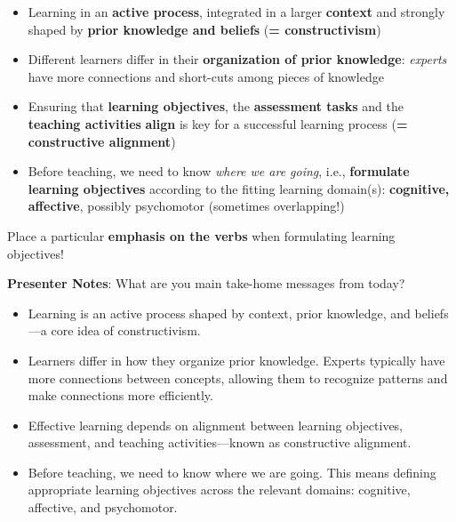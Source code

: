 \documentclass[
  letterpaper,
  DIV=11,
  numbers=noendperiod]{scrartcl}
\providecommand{\tightlist}{%
  \setlength{\itemsep}{0pt}\setlength{\parskip}{0pt}}
\begin{document}
\begin{itemize}
\item
  Learning in an \textbf{active process}, integrated in a larger
  \textbf{context} and strongly shaped by \textbf{prior knowledge and
  beliefs} (\textbf{= constructivism})
\item
  Different learners differ in their \textbf{organization of prior
  knowledge}: \emph{experts} have more connections and short-cuts among
  pieces of knowledge
\item
  Ensuring that \textbf{learning objectives}, the \textbf{assessment
  tasks} and the \textbf{teaching activities} \textbf{align} is key for
  a successful learning process (\textbf{= constructive alignment})
\item
  Before teaching, we need to know \emph{where we are going}, i.e.,
  \textbf{formulate learning objectives} according to the fitting
  learning domain(s): \textbf{cognitive, affective}, possibly
  psychomotor (sometimes overlapping!)
\end{itemize}

\begin{tcolorbox}[enhanced jigsaw, arc=.35mm, bottomrule=.15mm, bottomtitle=1mm, breakable, colback=white, colbacktitle=quarto-callout-tip-color!10!white, colframe=quarto-callout-tip-color-frame, coltitle=black, left=2mm, leftrule=.75mm, opacityback=0, opacitybacktitle=0.6, rightrule=.15mm, title=\textcolor{quarto-callout-tip-color}{\faLightbulb}\hspace{0.5em}{The formulation matters!}, titlerule=0mm, toprule=.15mm, toptitle=1mm]

Place a particular \textbf{emphasis on the verbs} when formulating
learning objectives!

\end{tcolorbox}

\textbf{Presenter Notes}: What are you main take-home messages from
today?

\begin{itemize}
\tightlist
\item
  Learning is an active process shaped by context, prior knowledge, and
  beliefs---a core idea of constructivism.
\item
  Learners differ in how they organize prior knowledge. Experts
  typically have more connections between concepts, allowing them to
  recognize patterns and make connections more efficiently.
\item
  Effective learning depends on alignment between learning objectives,
  assessment, and teaching activities---known as constructive alignment.
\item
  Before teaching, we need to know where we are going. This means
  defining appropriate learning objectives across the relevant domains:
  cognitive, affective, and psychomotor.
\end{itemize}
\end{document}
